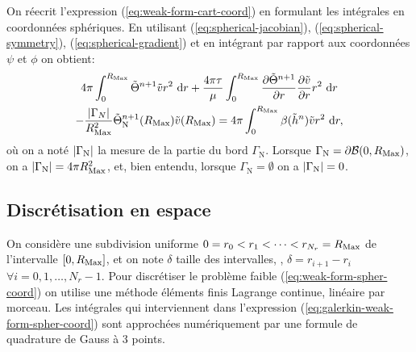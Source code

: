 On réecrit l'expression (\ref{eq:weak-form-cart-coord}) en formulant
les intégrales en coordonnées sphériques. En utilisant
(\ref{eq:spherical-jacobian}), (\ref{eq:spherical-symmetry}),
(\ref{eq:spherical-gradient}) et en intégrant par rapport aux
coordonnées $\psi$ et $\phi$ on obtient:
\begin{multline}\label{eq:weak-form-spher-coord}
  4\pi\int_0^{\rmax} \tilde \temperature^{n+1}\tilde v r^2\,\intd{r}
  + \frac{4\pi\tau}{\mu}\int_0^{\rmax} \frac{\partial %
    \tilde \temperature^{n+1}}{\partial r} \frac{\partial \tilde v}{\partial %
    r}r^2\,\intd{r} \\
  - \frac{\abs{\Gamma_N}}{\rmax^2}\tilde\temperature^{n+1}_\mathrm{N}(\rmax)\tilde v(\rmax) %
  = 4\pi\int_0^{\rmax} \beta(\tilde \enthalpydensity^n)\tilde v r^2\,\intd{r},
\end{multline}
où on a noté $\left\lvert \Gamma_\mathrm{N} \right\rvert$ la mesure de la partie du bord
$\Gamma_\mathrm{N}$. Lorsque $\Gamma_\mathrm{N} = \partial
\mathcal B(0, R_\mathrm{Max})$, on a $\left\lvert \Gamma_\mathrm{N} \right\rvert = 4\pi R_\mathrm{Max}^2$,
et, bien entendu, lorsque $\Gamma_\mathrm{N} = \emptyset$ on a
$\left\lvert \Gamma_\mathrm{N} \right\rvert = 0$.


\subsection*{Discrétisation en espace}
On considère une subdivision uniforme $0 = r_0 < r_1 < \dots < r_{N_r}
= R_\mathrm{Max}$ de l'intervalle $[0, R_\mathrm{Max}]$, et on note $\delta$ taille des
intervalles, \ie, $\delta = r_{i+1} - r_i$ $\forall i = 0,1,\dots,N_r
- 1$. Pour discrétiser le problème faible
(\ref{eq:weak-form-spher-coord}) on utilise une méthode éléments finis
Lagrange continue, linéaire par morceau. Les intégrales qui
interviennent dans l'expression
(\ref{eq:galerkin-weak-form-spher-coord}) sont approchées
numériquement par une formule de quadrature de Gauss à 3 points.


